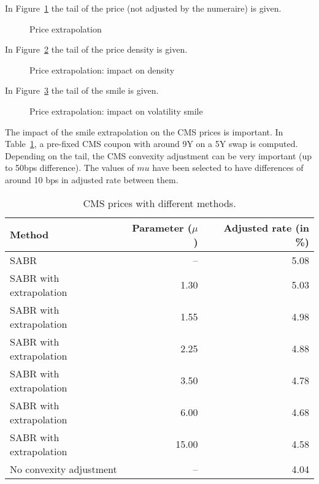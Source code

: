 \documentclass[]{amsart}
\begin{document}
In Figure~\ref{FigPrice} the tail of the price (not adjusted by the numeraire) is given.

\begin{figure}
\begin{center}
\end{center}
\caption{Price extrapolation}
\label{FigPrice}
\end{figure}

In Figure~\ref{FigDensity} the tail of the price density is given.

\begin{figure}
\begin{center}
\end{center}
\caption{Price extrapolation: impact on density}
\label{FigDensity}
\end{figure}

In Figure~\ref{FigSmile} the tail of the smile is given.

\begin{figure}
\begin{center}
\end{center}
\caption{Price extrapolation: impact on volatility smile}
\label{FigSmile}
\end{figure}

The impact of the smile extrapolation on the CMS prices is important. In Table~\ref{TabCMS}, a pre-fixed CMS coupon with around 9Y on a 5Y swap is computed. Depending on the tail, the CMS convexity adjustment can be very important (up to 50bps difference). The values of $mu$ have been selected to have differences of around 10 bps in adjusted rate between them. 

\begin{table}
\begin{tabular}{lrr}
Method & Parameter ($\mu$) & Adjusted rate (in \%) \\
\hline
SABR & -- & 5.08\\
SABR with extrapolation & 1.30 & 5.03\\
SABR with extrapolation & 1.55 & 4.98\\
SABR with extrapolation & 2.25 & 4.88\\
SABR with extrapolation & 3.50 & 4.78\\
SABR with extrapolation & 6.00 & 4.68\\
SABR with extrapolation & 15.00 & 4.58\\
No convexity adjustment & -- & 4.04
\end{tabular}
\caption{CMS prices with different methods.}
\label{TabCMS}
\end{table}
\end{document}
